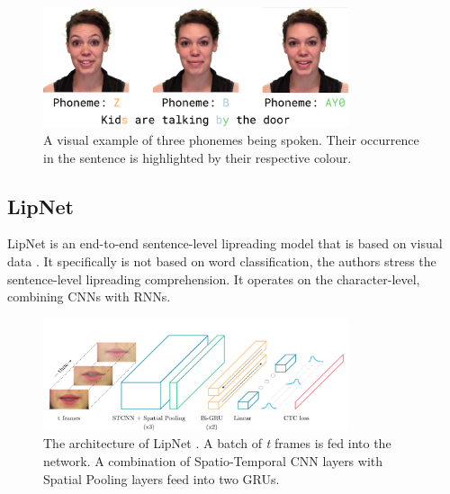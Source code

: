 
\begin{figure}
    \centering
    \includegraphics[width=0.8\textwidth]{res/phone_ex.pdf}
    \caption{A visual example of three phonemes being spoken. Their occurrence in the sentence is highlighted by their respective colour.}
    \label{fig:phoneme_ex}
\end{figure}

\subsection{LipNet}
\label{sec:lipnet_related}

LipNet is an end-to-end sentence-level lipreading model that is based on visual data \cite{assael2016lipnet}. It specifically is not based on word classification, the authors stress the sentence-level lipreading comprehension. It operates on the character-level, combining CNNs with RNNs.

\begin{figure}
    \centering
    \includegraphics[width=0.8\textwidth]{res/lipnet.png}
    \caption{The architecture of LipNet \cite{assael2016lipnet}. A batch of \textit{t} frames is fed into the network. A combination of Spatio-Temporal CNN layers with Spatial Pooling layers feed into two GRUs.}
    \label{fig:lipnet}
\end{figure}

